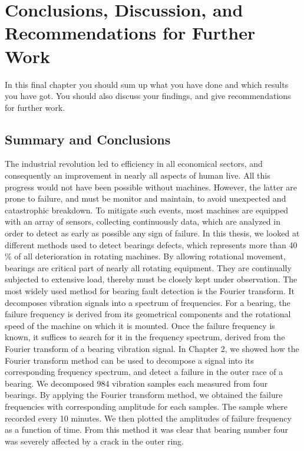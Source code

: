 \documentclass[thesis.tex]{subfiles}
\begin{document}
\chapter[Conclusions]{Conclusions, Discussion, and Recommendations for Further Work}
\label{ch:conclusions}
In this final chapter you should sum up what you have done and which results you have got. 
You should also discuss your findings, and give recommendations for further work.

\section{Summary and Conclusions}
\label{sec:summary_and_conclusions}
%
The industrial revolution led to efficiency in all economical sectors, and consequently an improvement in nearly all aspects of human live. All this progress would not have been possible without machines. However, the latter are prone to failure, and must be monitor and maintain, to avoid unexpected and catastrophic breakdown. To mitigate such events, most machines are equipped with an array of sensors, collecting continuously data, which are analyzed in order to detect as early as possible any sign of failure.
\justify
In this thesis, we looked at different methods used to detect bearings defects, which represents more than 40 $\%$ of all deterioration in rotating machines. By allowing rotational movement, bearings are critical part of nearly all rotating equipment. They are continually subjected to extensive load, thereby must be closely kept under observation. The most widely used method for bearing fault detection is the Fourier transform. It decomposes vibration signals into a spectrum of frequencies. For a bearing, the failure frequency is derived from its geometrical components and the rotational speed of the machine on which it is mounted. Once the failure frequency is known, it suffices to search for it in the frequency spectrum, derived from the Fourier transform of a bearing vibration signal.
\clearpage
\justify
In Chapter 2, we showed how the Fourier transform method can be used to decompose a signal into its corresponding frequency spectrum, and detect a failure in the outer race of a bearing. We decomposed 984 vibration samples each measured from four bearings. By applying the Fourier transform method, we obtained the failure frequencies with corresponding amplitude for each samples. The sample where recorded every 10 minutes. We then plotted the amplitudes of failure frequency as a function of time. From this method it was clear that bearing number four was severely affected by a crack in the outer ring. 
\end{document}
